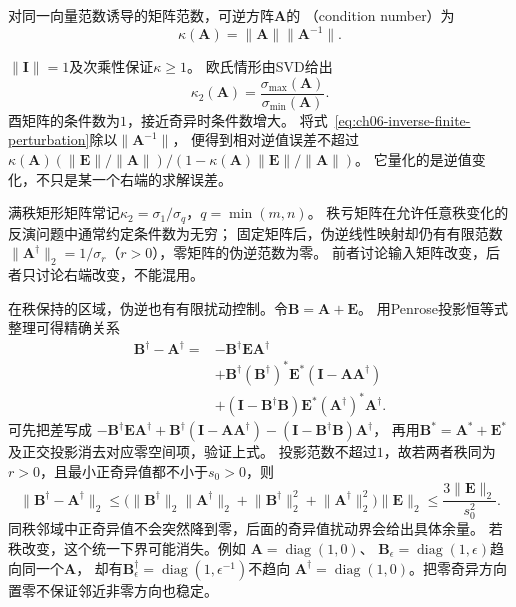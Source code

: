 \begin{definition}[可逆矩阵的条件数]
\label{def:matrix-analysis-condition-number}
对同一向量范数诱导的矩阵范数，可逆方阵$\bm A$的
（condition number）为
\begin{equation}
 \kappa(\bm A)=\lVert\bm A\rVert\lVert\bm A^{-1}\rVert.
 \label{eq:matrix-analysis-condition-number}
\end{equation}
\end{definition}
$\lVert\bm I\rVert=1$及次乘性保证$\kappa\geq1$。
欧氏情形由SVD给出
\begin{equation}
 \kappa_2(\bm A)=\frac{\sigma_{\max}(\bm A)}{\sigma_{\min}(\bm A)}.
 \label{eq:matrix-analysis-spectral-condition-number}
\end{equation}
酉矩阵的条件数为$1$，接近奇异时条件数增大。
将式~\eqref{eq:ch06-inverse-finite-perturbation}除以$\lVert\bm A^{-1}\rVert$，
便得到相对逆值误差不超过
$\kappa(\bm A)(\lVert\bm E\rVert/\lVert\bm A\rVert)/
(1-\kappa(\bm A)\lVert\bm E\rVert/\lVert\bm A\rVert)$。
它量化的是逆值变化，不只是某一个右端的求解误差。

满秩矩形矩阵常记$\kappa_2=\sigma_1/\sigma_q$，$q=\min(m,n)$。
秩亏矩阵在允许任意秩变化的反演问题中通常约定条件数为无穷；
固定矩阵后，伪逆线性映射却仍有有限范数
$\lVert\bm A^\dagger\rVert_2=1/\sigma_r$（$r>0$），零矩阵的伪逆范数为零。
前者讨论输入矩阵改变，后者只讨论右端改变，不能混用。

在秩保持的区域，伪逆也有有限扰动控制。令$\bm B=\bm A+\bm E$。
用Penrose投影恒等式整理可得精确关系
\[
 \begin{aligned}
 \bm B^\dagger-\bm A^\dagger
 ={}&-\bm B^\dagger\bm E\bm A^\dagger\\
 &+\bm B^\dagger(\bm B^\dagger)^*\bm E^*(\bm I-\bm A\bm A^\dagger)\\
 &+(\bm I-\bm B^\dagger\bm B)\bm E^*(\bm A^\dagger)^*\bm A^\dagger.
 \end{aligned}
\]
可先把差写成
$-\bm B^\dagger\bm E\bm A^\dagger+
\bm B^\dagger(\bm I-\bm A\bm A^\dagger)
-(\bm I-\bm B^\dagger\bm B)\bm A^\dagger$，
再用$\bm B^*=\bm A^*+\bm E^*$及正交投影消去对应零空间项，验证上式。
投影范数不超过$1$，故若两者秩同为$r>0$，且最小正奇异值都不小于$s_0>0$，则
\begin{equation}
 \lVert\bm B^\dagger-\bm A^\dagger\rVert_2
 \leq\bigl(\lVert\bm B^\dagger\rVert_2\lVert\bm A^\dagger\rVert_2
          +\lVert\bm B^\dagger\rVert_2^2
          +\lVert\bm A^\dagger\rVert_2^2\bigr)\lVert\bm E\rVert_2
 \leq\frac{3\lVert\bm E\rVert_2}{s_0^2}.
 \label{eq:ch06-pseudoinverse-fixed-rank-perturbation}
\end{equation}
同秩邻域中正奇异值不会突然降到零，后面的奇异值扰动界会给出具体余量。
若秩改变，这个统一下界可能消失。例如
$\bm A=\operatorname{diag}(1,0)$、
$\bm B_\epsilon=\operatorname{diag}(1,\epsilon)$趋向同一个$\bm A$，
却有$\bm B_\epsilon^\dagger=\operatorname{diag}(1,\epsilon^{-1})$不趋向
$\bm A^\dagger=\operatorname{diag}(1,0)$。把零奇异方向置零不保证邻近非零方向也稳定。


